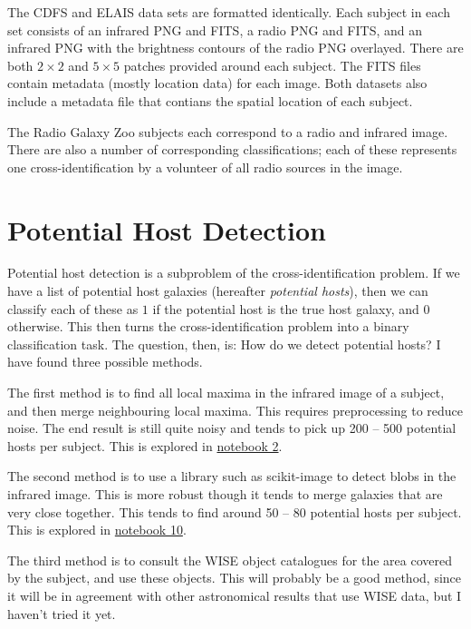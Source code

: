 \documentclass[a4paper]{article}
\begin{document}
        The CDFS and ELAIS data sets are formatted identically. Each subject in each set consists of an infrared PNG and FITS, a radio PNG and FITS, and an infrared PNG with the brightness contours of the radio PNG overlayed. There are both $2 \times 2$ and $5 \times 5$ patches provided around each subject. The FITS files contain metadata (mostly location data) for each image. Both datasets also include a metadata file that contians the spatial location of each subject.

        The Radio Galaxy Zoo subjects each correspond to a radio and infrared image. There are also a number of corresponding classifications; each of these represents one cross-identification by a volunteer of all radio sources in the image.

    \section{Potential Host Detection}

        Potential host detection is a subproblem of the cross-identification problem. If we have a list of potential host galaxies (hereafter \emph{potential hosts}), then we can classify each of these as $1$ if the potential host is the true host galaxy, and $0$ otherwise. This then turns the cross-identification problem into a binary classification task. The question, then, is: How do we detect potential hosts? I have found three possible methods.

        The first method is to find all local maxima in the infrared image of a subject, and then merge neighbouring local maxima. This requires preprocessing to reduce noise. The end result is still quite noisy and tends to pick up 200 -- 500 potential hosts per subject. This is explored in \href{https://github.com/chengsoonong/crowdastro/blob/master/notebooks/2_potential_host_counting.ipynb}{notebook 2}.

        The second method is to use a library such as scikit-image to detect blobs in the infrared image. This is more robust though it tends to merge galaxies that are very close together. This tends to find around 50 -- 80 potential hosts per subject. This is explored in \href{https://github.com/chengsoonong/crowdastro/blob/master/notebooks/10_potential_host_detection.ipynb}{notebook 10}.

        The third method is to consult the WISE object catalogues for the area covered by the subject, and use these objects. This will probably be a good method, since it will be in agreement with other astronomical results that use WISE data, but I haven't tried it yet.
\end{document}
